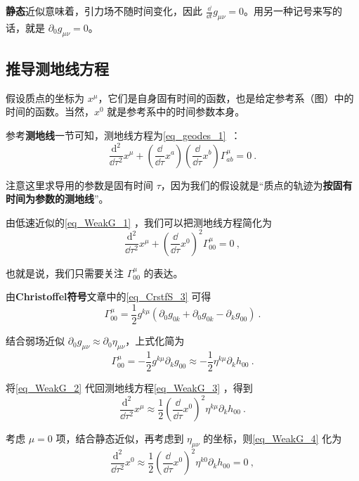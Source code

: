 \textbf{静态}近似意味着，引力场不随时间变化，因此 $\frac{\dd}{\dd t}g_{\mu\nu}=0$。用另一种记号来写的话，就是 $\partial_0g_{\mu\nu}=0$。

\subsection{推导测地线方程}

假设质点的坐标为 $x^\mu$，它们是自身固有时间的函数，也是给定参考系（图）中的时间的函数。当然，$x^0$ 就是参考系中的时间参数本身。

参考\textbf{测地线}一节可知，测地线方程为\autoref{eq_geodes_1}~：
\begin{equation}
\frac{\mathrm{d}^2}{\dd\tau^2}x^\mu+(\frac{\dd}{\dd\tau}x^a)(\frac{\dd}{\dd\tau}x^b)\Gamma^\mu_{ab}=0~.
\end{equation}

注意这里求导用的参数是固有时间 $\tau$，因为我们的假设就是“质点的轨迹为\textbf{按固有时间为参数的测地线}”。

由低速近似的\autoref{eq_WeakG_1} ，我们可以把测地线方程简化为
\begin{equation}\label{eq_WeakG_3}
\frac{\mathrm{d}^2}{\dd\tau^2}x^\mu+(\frac{\dd}{\dd\tau}x^0)^2\Gamma^\mu_{00}=0~,
\end{equation}

也就是说，我们只需要关注 $\Gamma^\mu_{00}$ 的表达。

由\textbf{Christoffel符号}文章中的\autoref{eq_CrstfS_3} 可得
\begin{equation}
\Gamma^\mu_{00}=\frac{1}{2}g^{k\mu}(\partial_0g_{0k}+\partial_0g_{0k}-\partial_{k}g_{00})~.
\end{equation}

结合弱场近似 $\partial_0g_{\mu\nu}\approx\partial_0\eta_{\mu\nu}$，上式化简为
\begin{equation}\label{eq_WeakG_2}
\Gamma^\mu_{00}=-\frac{1}{2}g^{k\mu}\partial_{k}g_{00}\approx-\frac{1}{2}\eta^{k\mu}\partial_{k}h_{00}~.
\end{equation}

将\autoref{eq_WeakG_2} 代回测地线方程\autoref{eq_WeakG_3} ，得到
\begin{equation}\label{eq_WeakG_4}
\frac{\mathrm{d}^2}{\dd\tau^2}x^\mu\approx\frac{1}{2}(\frac{\dd}{\dd\tau}x^0)^2\eta^{k\mu}\partial_{k}h_{00}~.
\end{equation}

考虑 $\mu=0$ 项，结合静态近似，再考虑到 $\eta_{\mu\nu}$ 的坐标，则\autoref{eq_WeakG_4} 化为
\begin{equation}
\frac{\mathrm{d}^2}{\dd\tau^2}x^0\approx\frac{1}{2}(\frac{\dd}{\dd\tau}x^0)^2\eta^{k0}\partial_{k}h_{00}=0~,
\end{equation}

